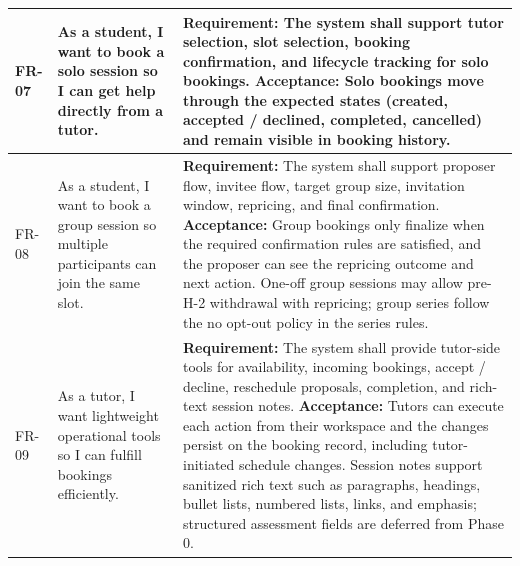 \documentclass[11pt,a4paper]{article}
\begin{document}
\begin{longtable}{|L{1.5cm}|L{4.1cm}|L{9.0cm}|}
	\hline
	FR-07           & As a student, I want to book a solo session so I can get help directly from a tutor.                                   & \textbf{Requirement:} The system shall support tutor selection, slot selection, booking confirmation, and lifecycle tracking for solo bookings. \newline \textbf{Acceptance:} Solo bookings move through the expected states (created, accepted / declined, completed, cancelled) and remain visible in booking history.                                                                                                                                                                                                                                                                                         \\
	\hline
	FR-08           & As a student, I want to book a group session so multiple participants can join the same slot.                          & \textbf{Requirement:} The system shall support proposer flow, invitee flow, target group size, invitation window, repricing, and final confirmation. \newline \textbf{Acceptance:} Group bookings only finalize when the required confirmation rules are satisfied, and the proposer can see the repricing outcome and next action. One-off group sessions may allow pre-H-2 withdrawal with repricing; group series follow the no opt-out policy in the series rules.                                                                                                                                                                                                                                                                              \\
	\hline
	FR-09           & As a tutor, I want lightweight operational tools so I can fulfill bookings efficiently.                                & \textbf{Requirement:} The system shall provide tutor-side tools for availability, incoming bookings, accept / decline, reschedule proposals, completion, and rich-text session notes. \newline \textbf{Acceptance:} Tutors can execute each action from their workspace and the changes persist on the booking record, including tutor-initiated schedule changes. Session notes support sanitized rich text such as paragraphs, headings, bullet lists, numbered lists, links, and emphasis; structured assessment fields are deferred from Phase 0.                                                                                                                                                                                                                                                         \\

\end{longtable}
\end{document}
